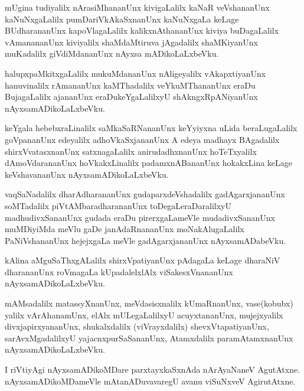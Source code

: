 \documentclass{article}
\begin{document}
\begin{mn}%
mUgina tudiyalilx nArasiMhananUnx kivigaLalilx kaNaR veVshananUnx kaNuNxgaLalilx 
pumDariVkAkaSxnanUnx kaNuNxgaLa keLage BUdharananUnx kapoVlagaLalilx kalikxnAthananUnx kiviya 
buDagaLalilx vAmanananUnx kiviyalilx shaMdaMtiruva jAgadalilx shaMKiyanUnx muKadalilx 
giVdiMdananUnx nAyxsa mADikoLaLxbeVku.
\end{mn}

\begin{mn}%
halupxpaMkitxgaLalilx mukuMdananUnx nAligeyalilx vAkapxtiyanUnx hanuvinalilx rAmananUnx 
kaMThadalilx veYkuMThananUnx eraDu BujagaLalilx ajananUnx eraDukeYgaLalilxyU shAkngxRpANiyanUnx 
nAyxsamADikoLaLxbeVku.
\end{mn}

\begin{mn}%
keYgala hebebxraLinalilx saMkaSaRNananUnx keYyiyxna uLida beraLugaLalilx goVpananUnx edeyalilx 
adhoVkaSxjananUnx A edeya madhayx BAgadalilx shirxVvatasxnanUnx satxnagaLalilx anirudadhxnanUnx 
hoTeTxyalilx dAmoVdarananUnx hoVkakxLinalilx padamxnABananUnx hokakxLina keLage keVshavananUnx 
nAyxsamADikoLaLxbeVku.
\end{mn}

\begin{mn}%
vaqSaNadalilx dharAdharananUnx gudaparxdeVshadalilx gadAgarxjananUnx soMTadalilx 
piVtAMbaradharananUnx toDegaLeraDaralilxyU madhudivxSananUnx gudada eraDu pirerxgaLameVle 
mudadivxSananUnx muMDiyiMda meVlu gaDe janAdaRnananUnx moNakAlugaLalilx PaNiVshananUnx hejejxgaLa 
meVle gadAgarxjananUnx nAyxsamADabeVku.
\end{mn}

\begin{mn}%
kAlina aMguSaThxgALalilx shirxVpatiyanUnx pAdagaLa keLage dharaNiV dharananUnx roVmagaLa 
kUpadalelxlAlx viSakesxVnananUnx nAyxsamADikoLaLxbeVku.
\end{mn}

\begin{mn}%
mAMsadalilx  matassyXnanUnx, meVdasisxnalilx kUmaRnanUnx, vase(kobubx) yalilx vArAhanamUnx, elAlx 
mULegaLalilxyU acuyxtananUnx, mujejxyalilx divxjapirxyananUnx, shukalxdalilx (viVrayxdalilx) 
shevxVtapatiyanUnx, sarAvxMgadalilxyU yajacnxpurSaSananUnx, Atamxdalilx paramAtamxnanUnx 
nAyxsamADikoLaLxbeVku.
\end{mn}

\begin{mn}%
I riVtiyAgi nAyxsamADikoMDare parxtayxkaSxnAda nArAyaNaneV AgutAtxne. nAyxsamADikoMDameVle 
mAtanADuvavaregU avanu viSuNxveV AgirutAtxne.
\end{mn}
\end{document}
